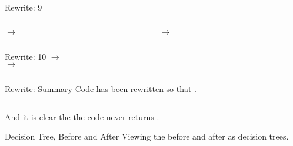 \begin{frame}{Rewrite: 9}

  \begin{columns}
    \begin{column}{0.5\textwidth}
      \colorbox{pink!30}{ $\to$ }
      \usebox\typecaseIbox
    \end{column}
    \begin{column}{0.5\textwidth}  %
      \colorbox{pink!30}{ $\to$ }
      \usebox\typecaseJhbox
    \end{column}    
  \end{columns}
\end{frame}

\begin{frame}{Rewrite: 10}
  \colorbox{pink!30}{ $\to$ }\\
  \colorbox{pink!30}{ $\to$ }

  \begin{columns}
    \begin{column}{0.5\textwidth}
      \usebox\typecaseJbox
    \end{column}
    \begin{column}{0.5\textwidth}  %
      \usebox\typecaseKhbox
    \end{column}
  \end{columns}
\end{frame}


\begin{frame}{Rewrite: Summary}
  Code has been rewritten so that .

  \begin{columns}
    \begin{column}{0.5\textwidth}
      \usebox\typecaseAbox
    \end{column}
    \begin{column}{0.5\textwidth}  %
      \usebox\typecaseKbox
    \end{column}
  \end{columns}

  And it is clear the the code never returns .

\end{frame}

\begin{frame}{Decision Tree, Before and After}
  Viewing the  before and after as decision trees.

  \begin{columns}
    \begin{column}{0.5\textwidth}
      \usebox\typecaseITEbox
    \end{column}
    \begin{column}{0.5\textwidth}  %
      \usebox\typecaseITEafterbox
    \end{column}
  \end{columns}
\end{frame}




